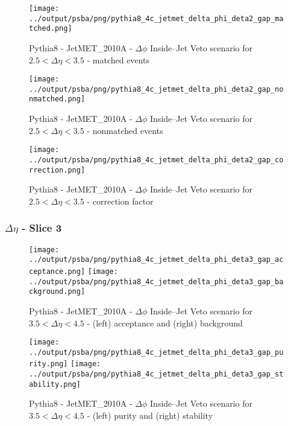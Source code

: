 \documentclass[11pt]{book}
\begin{document}
\begin{figure}[ht]
\centering
\texttt{[image: ../output/psba/png/pythia8\_4c\_jetmet\_delta\_phi\_deta2\_gap\_matched.png]}
\caption{Pythia8 - JetMET\_2010A - $\Delta\phi$ Inside--Jet Veto scenario for $2.5 < \Delta\eta < 3.5$ - matched events}
\label{fig:p8_jetmet_delta_phi_deta2_gap_matched}
\end{figure}

\begin{figure}[ht]
\centering
\texttt{[image: ../output/psba/png/pythia8\_4c\_jetmet\_delta\_phi\_deta2\_gap\_nonmatched.png]}
\caption{Pythia8 - JetMET\_2010A - $\Delta\phi$ Inside--Jet Veto scenario for $2.5 < \Delta\eta < 3.5$ - nonmatched events}
\label{fig:p8_jetmet_delta_phi_deta2_gap_nonmatched}
\end{figure}

\begin{figure}[ht]
\centering
\texttt{[image: ../output/psba/png/pythia8\_4c\_jetmet\_delta\_phi\_deta2\_gap\_correction.png]}
\caption{Pythia8 - JetMET\_2010A - $\Delta\phi$ Inside--Jet Veto scenario for $2.5 < \Delta\eta < 3.5$ - correction factor}
\label{fig:p8_jetmet_delta_phi_deta2_gap_correction}
\end{figure}



\clearpage
\subsubsection{$\Delta\eta$ - Slice 3}
\begin{figure}[ht]
\centering
\texttt{[image: ../output/psba/png/pythia8\_4c\_jetmet\_delta\_phi\_deta3\_gap\_acceptance.png]}
\texttt{[image: ../output/psba/png/pythia8\_4c\_jetmet\_delta\_phi\_deta3\_gap\_background.png]}
\caption{Pythia8 - JetMET\_2010A - $\Delta\phi$ Inside--Jet Veto scenario for $3.5 < \Delta\eta < 4.5$ - (left) acceptance and (right) background}
\label{fig:p8_jetmet_delta_phi_deta3_gap_ab}
\end{figure}

\begin{figure}[ht]
\centering
\texttt{[image: ../output/psba/png/pythia8\_4c\_jetmet\_delta\_phi\_deta3\_gap\_purity.png]}
\texttt{[image: ../output/psba/png/pythia8\_4c\_jetmet\_delta\_phi\_deta3\_gap\_stability.png]}
\caption{Pythia8 - JetMET\_2010A - $\Delta\phi$ Inside--Jet Veto scenario for $3.5 < \Delta\eta < 4.5$ - (left) purity and (right) stability}
\label{fig:p8_jetmet_delta_phi_deta3_gap_ps}
\end{figure}
\end{document}

